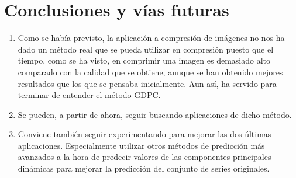 \documentclass[leqno]{beamer}
\begin{document}

\section{Conclusiones y vías futuras}

\begin{frame}
\begin{enumerate}
\item Como se había previsto, la aplicación a compresión de imágenes no nos ha dado un método real que se pueda utilizar en compresión puesto que el tiempo, como se ha visto, en comprimir una imagen es demasiado alto comparado con la calidad que se obtiene, aunque se han obtenido mejores resultados que los que se pensaba inicialmente. Aun así, ha servido para terminar de entender el método GDPC.
\item Se pueden, a partir de ahora, seguir buscando aplicaciones de dicho método.
\item Conviene también seguir experimentando para mejorar las dos últimas aplicaciones. Especialmente utilizar otros métodos de predicción más avanzados a la hora de predecir valores de las componentes principales dinámicas para mejorar la predicción del conjunto de series originales.
\end{enumerate}
\end{frame}
\end{document}
